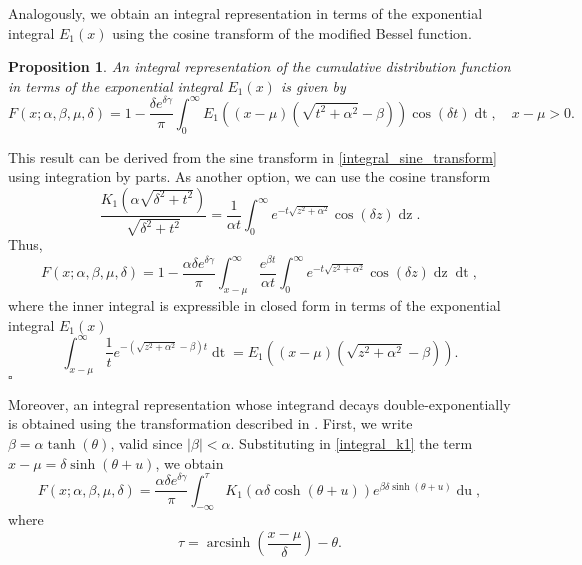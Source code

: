 \documentclass[10pt,a4paper,oneside]{article}
\newtheorem{proposition}[theorem]{Proposition}
\newenvironment{proof}{\noindent{\bf Proof:}}{\hfill$\square$}
\DeclareMathOperator{\arcsinh}{arcsinh}
\numberwithin{equation}{section}
\begin{document}
Analogously, we obtain an integral representation in terms of the exponential integral $E_1(x)$ using the cosine transform of the modified Bessel function.
\begin{proposition}
An integral representation of the cumulative distribution function in terms of the exponential integral $E_1(x)$ is given by
\begin{equation}
F(x; \alpha, \beta, \mu, \delta) = 1 - \frac{\delta e^{\delta \gamma}}{\pi}\int_0^{\infty} E_1\left((x-\mu)(\sqrt{t^2 + \alpha^2} - \beta)\right) \cos(\delta t) \mathop{dt}, \quad x-\mu > 0.
\end{equation}
\end{proposition}
\begin{proof}
This result can be derived from the sine transform in \eqref{integral_sine_transform} using integration by parts. As another option, we can use the cosine transform \cite[\S 1.4]{Bateman1954}
\begin{equation*}
\frac{K_1\left(\alpha\sqrt{\delta^2 + t^2}\right)}{\sqrt{\delta^2 + t^2}} = \frac{1}{\alpha t}\int_0^{\infty} e^{-t\sqrt{z^2 + \alpha^2}} \cos(\delta z) \mathop{dz}.
\end{equation*}
Thus,
\begin{equation*}
F(x; \alpha, \beta, \mu, \delta) = 1 - \frac{\alpha \delta e^{\delta \gamma}}{\pi}\int_{x-\mu}^{\infty} \frac{e^{\beta t}}{\alpha t}\int_0^{\infty} e^{-t\sqrt{z^2 + \alpha^2}} \cos(\delta z) \mathop{dz} \mathop{dt},
\end{equation*}
where the inner integral is expressible in closed form in terms of the exponential integral $E_1(x)$
\begin{equation*}
\int_{x-\mu}^{\infty}\frac{1}{t}e^{-(\sqrt{z^2 + \alpha^2} - \beta)t} \mathop{dt} = E_1\left((x-\mu)(\sqrt{z^2 + \alpha^2} - \beta)\right).
\end{equation*}
\end{proof}

Moreover, an integral representation whose integrand decays double-exponentially is obtained using the transformation described in \cite[\S 42.4]{Temme2015}. First, we write $\beta = \alpha \tanh(\theta)$, valid since $|\beta| < \alpha$. Substituting in \eqref{integral_k1} the term $x-\mu = \delta \sinh(\theta + u)$, we obtain
\begin{equation}
F(x; \alpha, \beta, \mu, \delta) = \frac{\alpha \delta e^{\delta \gamma}}{\pi} \int_{-\infty}^{\tau} K_1 \left(\alpha \delta \cosh(\theta + u)\right) e^{\beta \delta \sinh(\theta + u)} \mathop{du},
\end{equation}
where
\begin{equation}
\tau = \arcsinh\left(\frac{x - \mu}{\delta}\right) - \theta.
\end{equation}
\end{document}
